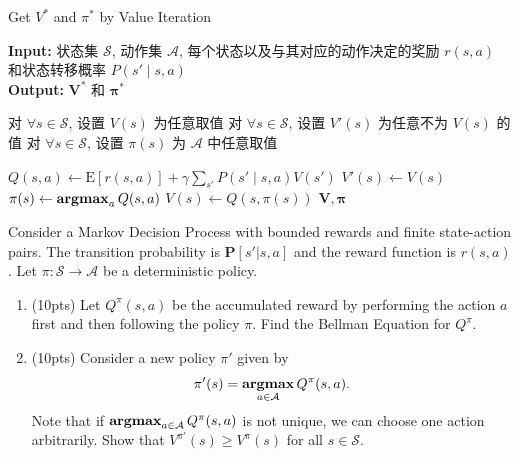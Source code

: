 \documentclass[11pt,letter,notitlepage]{article}
\DeclareMathOperator*{\argmax}{\bf argmax}
\newcommand{\expect}[1]{\text{E} [#1]}
\begin{document}
\begin{algorithm}
	\caption{Get $V^*$ and $\pi^*$ by Value Iteration}
	\label{alg:value_iteration}
	\textbf{Input:} 状态集 $\mathcal{S}$, 动作集 $\mathcal{A}$, 每个状态以及与其对应的动作决定的奖励 $r(s,a)$ 和状态转移概率 $P(s'\mid s,a)$ \\
	\textbf{Output:}  $\mathbf{V}^*$ 和 $\mathbf{\pi}^*$
	\begin{algorithmic}[1]
		\STATE 对 $\forall s\in \mathcal{S}$, 设置 $V(s)$ 为任意取值
		\STATE 对 $\forall s\in \mathcal{S}$, 设置 $V'(s)$ 为任意不为 $V(s)$ 的值
		\STATE 对 $\forall s\in \mathcal{S}$, 设置 $\pi(s)$ 为 $\mathcal{A}$ 中任意取值

		\STATE $Q(s,a)\leftarrow \expect{r(s,a)}+\gamma \sum_{s'}P(s'\mid s,a)V(s')$
		\ENDFOR
		\STATE $V'(s)\leftarrow V(s)$
		\STATE $\pi(s)\leftarrow \argmax_a Q(s,a)$
		\STATE $V(s)\leftarrow Q(s,\pi(s))$
		\ENDFOR
		\ENDWHILE
		\RETURN $\mathbf{V}, \mathbf{\pi}$
	\end{algorithmic}
\end{algorithm}

\newpage
\begin{exercise}
	Consider a Markov Decision Process with bounded rewards and finite state-action pairs. The transition probability is $\mathbf{P}[s'|s,a]$ and the reward function is $r(s,a)$. Let $\pi:\mathcal{S}\rightarrow\mathcal{A}$ be a deterministic policy.
	\begin{enumerate}
		\item (10pts) Let $Q^\pi (s,a)$ be the accumulated reward by performing the action $a$ first and then following the policy $\pi$. Find the Bellman Equation for $Q^\pi$.
		\item (10pts) Consider a new policy $\pi'$ given by
		      \begin{align*}
			      \pi'(s)=\argmax_{a\in\mathcal{A}} Q^\pi(s,a).
		      \end{align*}
		      Note that if $\argmax_{a\in\mathcal{A}} Q^\pi(s,a)$ is not unique, we can choose one action arbitrarily. Show that  $V^{\pi'}(s) \geq V^\pi(s)$ for all $s\in \mathcal{S}$.
	\end{enumerate}
\end{exercise}
\end{document}
